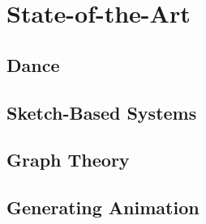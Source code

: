 \chapter{State-of-the-Art}


\section{Dance}


\section{Sketch-Based Systems}


\section{Graph Theory}


\section{Generating Animation}

